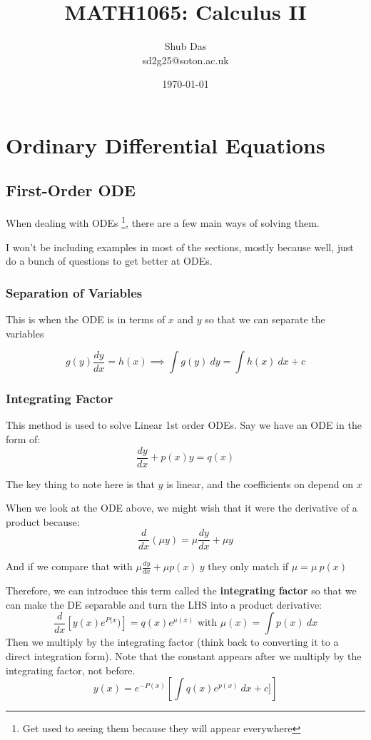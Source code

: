 \title{MATH1065: Calculus II}
\author{Shub Das \\ sd2g25@soton.ac.uk}
\date{\today}

\maketitle

\tableofcontents 

\part{Ordinary Differential Equations}

\chapter{First-Order ODE}

When dealing with ODEs \footnote{Get used to seeing them because they will appear everywhere}, there are a few main ways of solving them.  

I won't be including examples in most of the sections, mostly because well, just do a bunch of questions to get better at ODEs. 

\section{Separation of Variables}

This is when the ODE is in terms of $x$ and $y$ so that we can separate the variables 

$$
g(y) \frac{dy}{dx} = h(x) \implies \int g(y) \ dy = \int h(x) \ dx + c 
$$

\section{Integrating Factor}

This method is used to solve Linear 1st order ODEs. Say we have an ODE in the form of:
$$
\frac{dy}{dx} + p(x) y = q(x) 
$$

The key thing to note here is that $y$ is linear, and the coefficients on depend on $x$ 

When we look at the ODE above, we might wish that it were the derivative of a product because: 
$$
\frac{d}{dx} (\mu y) = \mu \frac{dy}{dx} + \mu y 
$$


And if we compare that with $\mu \frac{dy}{dx} + \mu p(x) \ y$ they only match if $\mu = \mu \ p(x)$


Therefore, we can introduce this term called the \textbf{integrating factor} so that we can make the DE separable and turn the LHS into a product derivative:
$$
\frac{d}{dx} [ y(x) e^{P(x})] = q(x) e^{\mu(x)} \text{ with } \mu(x) = \int p(x)\ dx 
$$
Then we multiply by the integrating factor (think back to converting it to a direct integration form). Note that the constant appears after we multiply by the integrating factor, not before. 
$$ 
y(x) = e^{-P(x)} \left[ \int q(x) e^{p(x)} \ dx + c] \right]
$$

